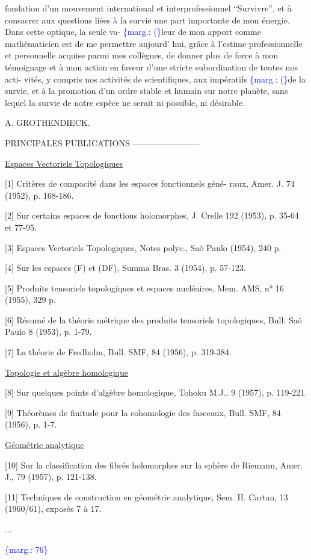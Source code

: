 \documentclass[11pt]{article}
\newcommand{\scanpage}[1]{\par\bigskip\noindent{\small\sffamily[scan #1]}\par}
\newcommand{\mspage}[1]{{\small\sffamily[p.\,#1]}}
\newcommand{\hand}[1]{\textcolor{blue}{#1}}
\newcommand{\margin}[1]{\textcolor{blue}{\{\textsf{marg.:} #1\}}}
\newcommand{\uline}[1]{\underline{#1}}
\begin{document}
\mspage{\hand{75}}

\clearpage
\scanpage{24/76}
\mspage{-3-}

fondation d'un mouvement international et interprofessionnel
``Survivre'', et à consacrer aux questions liées à la survie une
part importante de mon énergie. Dans cette optique, la seule va-%
\margin{(}leur de mon apport comme mathématicien est de me permettre aujourd'
hui, grâce à l'estime professionnelle et personnelle acquise parmi
mes collègues, de donner plus de force à mon témoignage et à mon
action en faveur d'une stricte subordination de toutes nos acti-%
vités, y compris nos activités de scientifiques, aux impératifs
\margin{(}de la survie, et à la promotion d'un ordre stable et humain sur
notre planète, sans lequel la survie de notre espèce ne serait
ni possible, ni désirable.

A. GROTHENDIECK.

PRINCIPALES PUBLICATIONS
------------------------

\uline{Espaces Vectoriels Topologiques}

[1] Critères de compacité dans les espaces fonctionnels géné-%
raux, Amer. J. 74 (1952), p. 168-186.

[2] Sur certains espaces de fonctions holomorphes, J. Crelle
192 (1953), p. 35-64 et 77-95.

[3] Espaces Vectoriels Topologiques, Notes polyc., Sa\~o Paulo
(1954), 240 p.

[4] Sur les espaces (F) et (DF), Summa Bras. 3 (1954),
p. 57-123.

[5] Produits tensoriels topologiques et espaces nucléaires,
Mem. AMS, n° 16 (1955), 329 p.

[6] Résumé de la théorie métrique des produits tensoriels
topologiques, Bull. Sa\~o Paulo 8 (1953), p. 1-79.

[7] La théorie de Fredholm, Bull. SMF, 84 (1956), p. 319-384.

\uline{Topologie et algèbre homologique}

[8] Sur quelques points d'algèbre homologique, Tohoku M.J.,
9 (1957), p. 119-221.

[9] Théorèmes de finitude pour la cohomologie des fasceaux,
Bull. SMF, 84 (1956), p. 1-7.

\uline{Géométrie analytique}

[10] Sur la classification des fibrés holomorphes sur la
sphère de Riemann, Amer. J., 79 (1957), p. 121-138.

[11] Techniques de construction en géométrie analytique,
Sem. H. Cartan, 13 (1960/61), exposés 7 à 17.

...

\margin{76}
\end{document}
